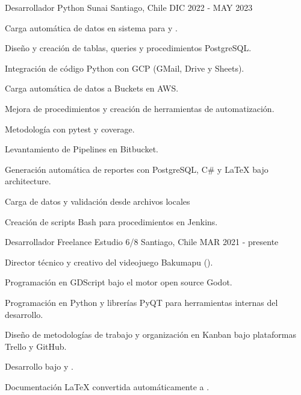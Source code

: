 

\begin{cventries}
	
\cventry
{Desarrollador Python} %
{Sunai} %
{Santiago, Chile} %
{DIC 2022 - MAY 2023} %
{
	\begin{cvitems} %
		\item {Carga automática de datos en sistema  para  y .}
		\item {Diseño y creación de tablas, queries y procedimientos PostgreSQL.}
		\item {Integración de código Python con GCP (GMail, Drive y Sheets).}
		\item {Carga automática de datos a Buckets en AWS.}
		\item {Mejora de procedimientos y creación de herramientas de automatización.}
		\item {Metodología  con pytest y coverage.}
		\item {Levantamiento de Pipelines en Bitbucket.}
		\item {Generación automática de reportes con PostgreSQL, C\# y LaTeX bajo  architecture.}
		\item {Carga de datos y validación desde archivos  locales}
		\item {Creación de scripts Bash para procedimientos en Jenkins.}
	\end{cvitems}
}

  \cventry
    {Desarrollador Freelance} %
    {Estudio 6/8} %
    {Santiago, Chile} %
    {MAR 2021 - presente} %
    {
      \begin{cvitems} %
        \item {Director técnico y creativo del videojuego Bakumapu ().}
        \item {Programación en GDScript bajo el motor open source Godot.}
        \item {Programación en Python y librerías PyQT para herramientas internas del desarrollo.}
        \item {Diseño de metodologías de trabajo y organización en Kanban bajo plataformas Trello y GitHub.}
        \item {Desarrollo bajo  y .}
        \item {Documentación LaTeX convertida automáticamente a .} 
      \end{cvitems}
    }


\end{cventries}
